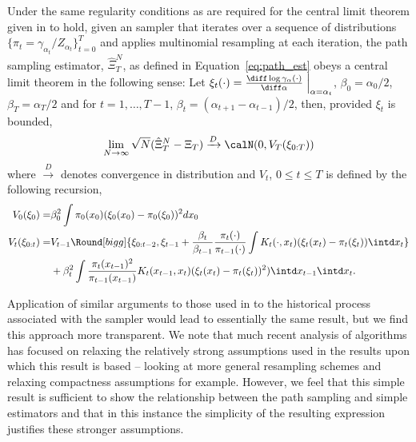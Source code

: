 \begin{proposition}\label{prop:path_clt}
  Under the same regularity conditions as are required for the central limit theorem given in \cite{DelMoral:2006hc} to hold, given an \smc sampler that iterates over a sequence of distributions $\{\pi_t = \gamma_{\alpha_t}/Z_{\alpha_t}\}_{t=0}^T$ and applies multinomial resampling at each iteration, the path sampling estimator, $\hat\Xi_{T}^{N}$, as defined in Equation~\eqref{eq:path_est} obeys a central limit theorem in the following sense: Let $\xi_t(\cdot) = \frac{\diff\log \gamma_{\alpha}(\cdot)}{\diff\alpha}\Bigm|_{\alpha = \alpha_t}$, $\beta_{0} = \alpha_0 / 2$, $\beta_{T} = \alpha_T / 2$ and for $t = 1,\ldots,T-1$, $\beta_t = (\alpha_{t + 1} - \alpha_{t-1})/2$, then, provided $\xi_t$ is bounded,
  \begin{equation}
    \lim_{N\to\infty}\sqrt{N}(\hat\Xi_{T}^{N} - \Xi_T)
    \xrightarrow{D}\calN(0, V_T(\xi_{0:T}))
  \end{equation}
  where $\xrightarrow{D}$ denotes convergence in distribution and $V_t$, $0\le t \le T$ is defined by the following recursion,
  \begin{align}
    V_0(\xi_0) =&  \beta_0^2
    \int \pi_0(x_0) (\xi_0(x_0)
    - \pi_0(\xi_0))^2 dx_0 \\
    V_t(\xi_{0:t}) =& V_{t-1}\Round[bigg]{\xi_{0:t-2}, \xi_{t-1}
    + \frac{\beta_t}{\beta_{t-1}}
    \frac{\pi_{t}(\cdot)}{\pi_{t-1}(\cdot)}
    \int K_t(\cdot,x_t) (\xi_t(x_t)-\pi_t(\xi_t)) \intd x_t
    } \\\notag
    &+ \beta_t^2 \int\frac{\pi_t(x_{t-1})^2}{\pi_{t-1}(x_{t-1})}
    K_t(x_{t-1},x_t)(\xi_t(x_t) - \pi_t(\xi_t))^2) \intd x_{t-1} \intd x_t.
  \end{align}
\end{proposition}

Application of similar arguments to those used in \cite{DelMoral:2006hc} to the historical process associated with the \smc sampler would lead to essentially the same result, but we find this approach more transparent. We note that much recent analysis of \smc algorithms has focused on relaxing the relatively strong assumptions used in the results upon which this result is based -- looking at more general resampling schemes \cite{DelMoral:2012jq} and relaxing compactness assumptions \cite{Whiteley:2013vx} for example. However, we feel that this simple result is sufficient to show the relationship between the path sampling and simple estimators and that in this instance the  simplicity of the resulting expression justifies these stronger assumptions.
 

